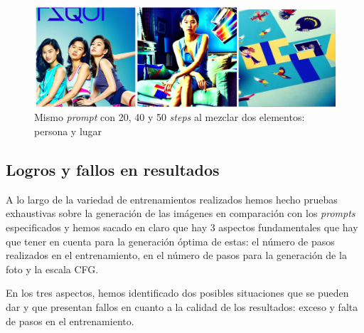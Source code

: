 \begin{figure}[!htb]
	\centering
	\includegraphics[width = 1
	\textwidth]{Imagenes/Vectorial/resultadoshojuyfrnds.png}
	\caption{Mismo \textit{prompt} con 20, 40 y 50 \textit{steps} al mezclar dos elementos: persona y lugar}
	\label{fig:comparacionhojufrdns}
\end{figure}


\subsection{Logros y fallos en resultados}

A lo largo de la variedad de entrenamientos realizados hemos hecho pruebas exhaustivas sobre la generación de las imágenes en comparación con los \textit{prompts} especificados y hemos sacado en claro que hay 3 aspectos fundamentales que hay que tener en cuenta para la generación óptima de estas: el número de pasos realizados en el entrenamiento, en el número de pasos para la generación de la foto y la escala CFG. 

En los tres aspectos, hemos identificado dos posibles situaciones que se pueden dar y que presentan fallos en cuanto a la calidad de los resultados: exceso y falta de pasos en el entrenamiento. 

